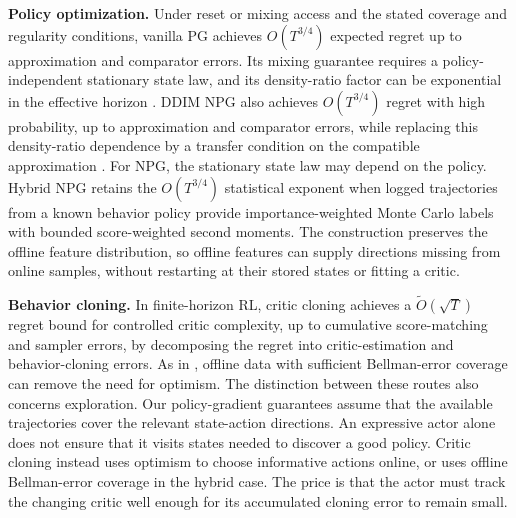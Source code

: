 \textbf{Policy optimization.}
Under reset or mixing access and the stated coverage and regularity conditions, vanilla PG achieves $O(T^{3/4})$ expected regret up to approximation and comparator errors. Its mixing guarantee requires a policy-independent stationary state law, and its density-ratio factor can be exponential in the effective horizon \citep{agarwal2021theory}. DDIM NPG also achieves $O(T^{3/4})$ regret with high probability, up to approximation and comparator errors, while replacing this
density-ratio dependence by a transfer condition on the compatible approximation \citep{kakade2001natural, song2022denoisingdiffusionimplicitmodels}. For NPG, the stationary state law may depend on the policy. Hybrid NPG retains the $O(T^{3/4})$ statistical exponent when logged trajectories from a known behavior policy provide importance-weighted Monte Carlo labels with bounded score-weighted second moments. The construction preserves the offline feature distribution, so offline features can supply directions missing from online samples, without restarting at their stored states or fitting a critic.

\textbf{Behavior cloning.}
In finite-horizon RL, critic cloning \citep{li2024learningmultimodalbehaviorsscratch, yang2023policyrepresentationdiffusionprobability} achieves a $\widetilde O(\sqrt T)$ regret bound for controlled critic complexity,
up to cumulative score-matching and sampler errors, by decomposing the regret into critic-estimation and behavior-cloning errors. As in \citet{song2023hybrid}, offline data with sufficient Bellman-error coverage
can remove the need for optimism.
The distinction between these routes also concerns exploration. Our policy-gradient guarantees assume that the available trajectories cover the relevant state-action directions. An expressive actor alone does not ensure that it visits states needed to discover a good policy. Critic cloning instead uses optimism to choose informative actions online, or uses offline Bellman-error coverage in the hybrid case. The price is that the actor must track the changing critic well enough for its accumulated cloning error to remain small.

